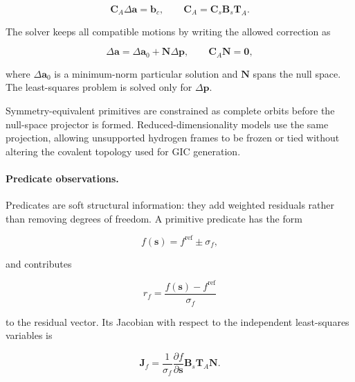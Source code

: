 \documentclass[aip,jcp,reprint,longbibliography,floatfix]{revtex4-2}
\begin{document}
\begin{equation}
\mathbf{C}_{A}
\Delta\mathbf{a}
=
\mathbf{b}_c,
\qquad
\mathbf{C}_{A}
=
\mathbf{C}_s
\mathbf{B}_s
\mathbf{T}_{A}.
\end{equation}

The solver keeps all compatible motions by writing the allowed correction as

\begin{equation}
\Delta\mathbf{a}
=
\Delta\mathbf{a}_0
+
\mathbf{N}\Delta\mathbf{p},
\qquad
\mathbf{C}_{A}\mathbf{N}=\mathbf{0},
\end{equation}

where $\Delta\mathbf{a}_0$ is a minimum-norm particular solution and
$\mathbf{N}$ spans the null space. The least-squares problem is solved only
for $\Delta\mathbf{p}$.

Symmetry-equivalent primitives are constrained as complete orbits before the
null-space projector is formed. Reduced-dimensionality models use the same projection,
allowing unsupported hydrogen frames to be frozen or tied without altering the covalent topology
used for GIC generation.

\paragraph{Predicate observations.}

Predicates are soft structural information: they add weighted residuals rather
than removing degrees of freedom.\cite{Bartell1975Predicate} A primitive
predicate has the form

\begin{equation}
f(\mathbf{s})
=
f^{\mathrm{ref}}
\pm
\sigma_f ,
\end{equation}

and contributes

\begin{equation}
r_f
=
\frac{f(\mathbf{s})-f^{\mathrm{ref}}}{\sigma_f}
\end{equation}

to the residual vector. Its Jacobian with respect to the independent
least-squares variables is

\begin{equation}
\mathbf{J}_f
=
\frac{1}{\sigma_f}
\frac{\partial f}{\partial\mathbf{s}}
\mathbf{B}_s
\mathbf{T}_{A}
\mathbf{N}.
\end{equation}
\end{document}
